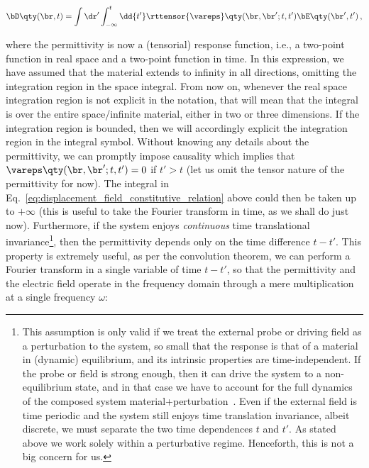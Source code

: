 \begin{equation}
    \label{eq:displacement_field_constitutive_relation}
    \bD\qty(\br,t) = \int \dr' \int_{-\infty}^t \dd{t'} \rttensor{\vareps}\qty(\br, \br'; t , t') \bE\qty(\br',t')\,,
\end{equation}

\noindent where the permittivity is now a (tensorial) response function, i.e., a two-point function in real space and a two-point function in time.
In this expression, we have assumed that the material extends to infinity in all directions, omitting the integration region in the space integral.
From now on, whenever the real space integration region is not explicit in the notation, that will mean that the integral is over the entire space/infinite material, either in two or three dimensions.
If the integration region is bounded, then we will accordingly explicit the integration region in the integral symbol.
Without knowing any details about the permittivity, we can promptly impose causality which implies that $\vareps\qty(\br, \br'; t , t') = 0$ if $t' > t$ (let us omit the tensor nature of the permittivity for now).
The integral in Eq.~\eqref{eq:displacement_field_constitutive_relation} above could then be taken up to $+\infty$ (this is useful to take the Fourier transform in time, as we shall do just now).
Furthermore, if the system enjoys \textit{continuous} time translational invariance\footnote{This assumption is only valid if we treat the external probe or driving field as a perturbation to the system, so small that the response is that of a material in (dynamic) equilibrium, and its intrinsic properties are time-independent. If the probe or field is strong enough, then it can drive the system to a non-equilibrium state, and in that case we have to account for the full dynamics of the composed system material+perturbation~\cite{Sloan_Rivera_Joannopoulos_Soljacic_2024}. Even if the external field is time periodic and the system still enjoys time translation invariance, albeit discrete, we must separate the two time dependences $t$ and $t'$. As stated above we work solely within a perturbative regime. Henceforth, this is not a big concern for us.\label{fn:time_invariance_ch_2}}, then the permittivity depends only on the time difference $t - t'$.
This property is extremely useful, as per the convolution theorem, we can perform a Fourier transform in a single variable of time $t-t'$, so that the permittivity and the electric field operate in the frequency domain through a mere multiplication at a single frequency $\omega$:

